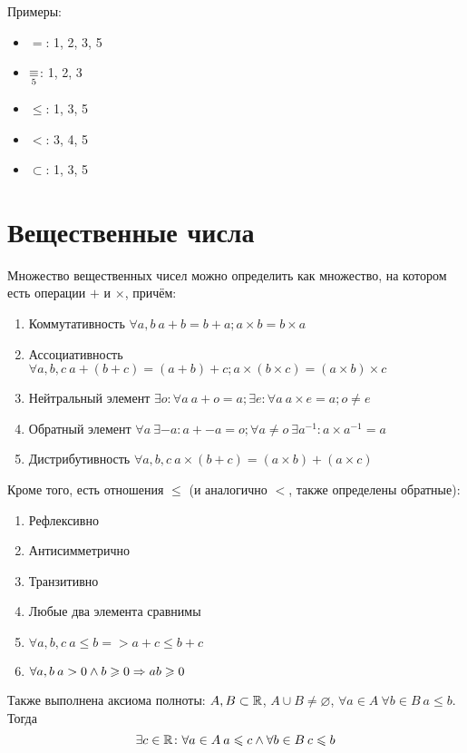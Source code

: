 Примеры:
\begin{itemize} 
\item $=$: 1, 2, 3, 5
\item $\mathop{\equiv}\limits_{5}$: 1, 2, 3
\item $\leqslant$: 1, 3, 5
\item $<$: 3, 4, 5
\item $\subset$: 1, 3, 5
\end{itemize}

\section{Вещественные числа}
\begin{Def}
Множество вещественных чисел можно определить как множество, на котором есть операции $+$ и $\times$, причём:
\begin{enumerate}
\item Коммутативность $\forall a, b\: a + b = b + a; a \times b = b \times a$
\item Ассоциативность $\forall a, b, c\: a + (b + c) = (a + b) + c; a \times (b \times c) = (a \times b) \times c$
\item Нейтральный элемент
$\exists o\colon \forall a\: a + o = a; \exists e\colon \forall a\:a \times e = a; o \ne e$
\item Обратный элемент
$\forall a\: \exists{-a}\colon a + -a = o; \forall a \ne o\: \exists a^{-1}: a \times a^{-1} = a$
\item Дистрибутивность $\forall a, b, c\: a \times (b + c) = (a \times b) + (a \times c)$
\end{enumerate}
Кроме того, есть отношения $\leqslant$ (и аналогично $<$, также определены обратные):
\begin{enumerate}
\item Рефлексивно
\item Антисимметрично
\item Транзитивно
\item Любые два элемента сравнимы
\item $\forall a, b, c\: a \leqslant b => a + c \leqslant b + c$
\item $\forall a, b\: a > 0 \land b \geqslant 0 \Rightarrow ab \geqslant 0$
\end{enumerate}
\end{Def}

Также выполнена аксиома полноты: $A, B \subset \mathbb{R}$, $A \cup B \ne \varnothing$, $ \forall a \in A\: \forall b \in B\: a \leqslant b $. Тогда 
$$\exists c \in \mathbb{R}\colon \forall a \in A\: a \leqslant c \land \forall b \in B\: c \leqslant b$$

